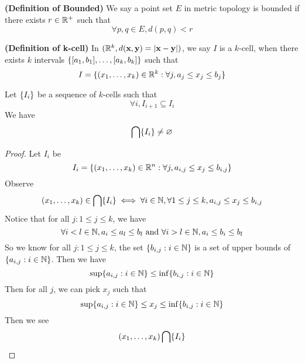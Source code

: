\documentclass{report}
\begin{document}
\begin{definition}
\label{2.9.2}
\textbf{(Definition of Bounded)} We say a point set $E$ in metric topology is bounded if there exists $r\in\mathbb{R}^+$ such that
\begin{equation}
\forall p,q\in E, d(p,q)<r
\end{equation}
\end{definition}
\begin{definition}
\label{2.9.3}
\textbf{(Definition of k-cell)} In $(\mathbb{R}^k,d(\textbf{x},\textbf{y})=|\textbf{x}-\textbf{y}|)$,  we say $I$ is a $k$-cell, when there exists  $k$ intervals  $\{ [a_1,b_1],\dots , [a_k,b_k] \}$ such that
 \begin{equation}
   I=\{ (x_1,\dots , x_k)\in \mathbb{R}^k: \forall j, a_j\leq x_j\leq b_j  \}
\end{equation}
\end{definition}
\begin{lemma}
\label{2.9.4}
Let $\{ I_i \}$ be a sequence of $k$-cells such that
 \begin{equation}
\forall i, I_{i+1}\subseteq I_i
\end{equation}
We have
\begin{equation}
\bigcap \{ I_i \}\neq \varnothing
\end{equation}
\end{lemma}
\begin{proof}
Let $I_i$ be 
 \begin{equation}
I_i=\{ (x_1,\dots , x_k)\in \mathbb{R}^n: \forall j, a_{i,j}\leq x_j\leq b_{i,j} \}
\end{equation}
Observe
\begin{equation}
  (x_1,\dots , x_k)\in \bigcap \{ I_i \}\iff \forall i \in\mathbb{N},\forall 1\leq j\leq k, a_{i,j}\leq x_j\leq b_{i,j}
\end{equation}
Notice that for all $j:1\leq j\leq k$, we have
\begin{equation}
\forall i<l\in\mathbb{N}, a_i\leq a_l\leq b_l\text{ and }\forall i>l\in\mathbb{N}, a_i\leq b_i\leq b_l
\end{equation}
So we know for all $j:1\leq j\leq k$, the set $\{ b_{i,j}:i\in\mathbb{N} \}$ is a set of upper bounds of   $\{ a_{i,j}:i\in\mathbb{N} \}$. Then we have
\begin{equation}
\sup \{ a_{i,j}:i\in\mathbb{N} \}\leq \inf \{ b_{i,j}:i\in\mathbb{N} \}
\end{equation}
Then for all $j$, we can pick $x_j$ such that
 \begin{equation}
\sup \{ a_{i,j}:i\in\mathbb{N} \}\leq x_j\leq \inf \{ b_{i,j}:i\in\mathbb{N} \}
\end{equation}
Then we see 
\begin{equation}
  (x_1,\dots ,x_k)\bigcap \{ I_i \}
\end{equation}
\end{proof}
\end{document}
